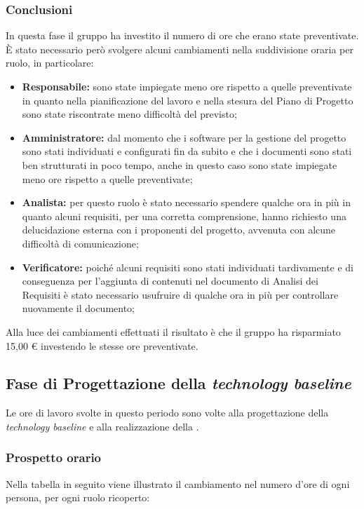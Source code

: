 		\subsubsection*{Conclusioni }
			In questa fase il gruppo ha investito il numero di ore che erano state preventivate. È stato necessario però svolgere alcuni cambiamenti nella suddivisione oraria per ruolo, in particolare:
			\begin{itemize}
				\item \textbf{Responsabile:} sono state impiegate meno ore rispetto a quelle preventivate in quanto nella pianificazione del lavoro e nella stesura del Piano di Progetto sono state riscontrate meno difficoltà del previsto;	 
				\item \textbf{Amministratore:} dal momento che i software per la gestione del progetto sono stati individuati e configurati fin da subito e che i documenti sono stati ben strutturati in poco tempo, anche in questo caso sono state impiegate meno ore rispetto a quelle preventivate;	 
				\item \textbf{Analista:} per questo ruolo è stato necessario spendere qualche ora in più in quanto alcuni requisiti, per una corretta comprensione, hanno richiesto una delucidazione esterna con i proponenti del progetto, avvenuta con alcune difficoltà di comunicazione;
				\item \textbf{Verificatore:} poiché alcuni requisiti sono stati individuati tardivamente e di conseguenza per l'aggiunta di contenuti nel documento di Analisi dei Requisiti è stato necessario usufruire di qualche ora in più per controllare nuovamente il documento;
			\end{itemize}
			Alla luce dei cambiamenti effettuati il risultato è che il gruppo ha risparmiato 15,00 € investendo le stesse ore preventivate.

			

		\subsection{Fase di Progettazione della \textit{technology baseline}}
		Le ore di lavoro svolte in questo periodo sono volte alla progettazione della \textit{technology baseline} e alla realizzazione della . 
		\subsubsection{Prospetto orario}
			Nella tabella in seguito viene illustrato il cambiamento nel numero d'ore di ogni persona, per ogni ruolo ricoperto:
			
